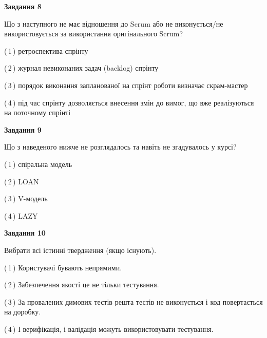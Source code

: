 \documentclass[10pt, ukrainian]{article}
\begin{document}
{\begin {large}
{\begin {center}\textbf{Завдання 8}\end {center}}\par
Що з наступного не має відношення до Scrum або не виконується/не використовується за використання оригінального Scrum?\par
\vspace{2mm}



(\,1\,) ретроспектива спрінту%



(\,2\,) журнал невиконаних задач (backlog) спрінту%



(\,3\,) порядок виконання запланованої на спрінт роботи визначає скрам-мастер%



(\,4\,) під час спрінту дозволяється внесення змін до вимог, що вже реалізуються на поточному спрінті%


{\begin {center}\textbf{Завдання 9}\end {center}}\par
Що з наведеного нижче не розглядалось та навіть не згадувалось у курсі?\par
\vspace{2mm}



(\,1\,) спіральна модель%



(\,2\,) LOAN%



(\,3\,) V-модель%



(\,4\,) LAZY%


{\begin {center}\textbf{Завдання 10}\end {center}}\par
Вибрати всі істинні твердження (якщо існують).\par
\vspace{2mm}



(\,1\,) Користувачі бувають непрямими.%



(\,2\,) Забезпечення якості це не тільки тестування.%



(\,3\,) За провалених димових тестів решта тестів не виконується і код повертається на доробку.%



(\,4\,) І верифікація, і валідація можуть використовувати тестування.%



\end {large}}
\end{document}
